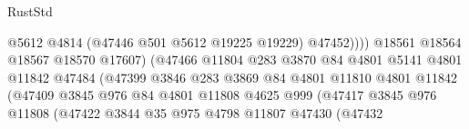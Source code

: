 \begin{lexlean}{RustStd}
\begin{coremodule}
                                                    @5612
                                                    @4814
                                                    (@47446 @501 @5612 @19225 @19229)
                                                    @47452))))
                                            @18561
                                            @18564
                                            @18567
                                            @18570
                                            @17607)
                                          (@47466
                                            @11804
                                            @283
                                            @3870
                                            @84
                                            @4801
                                            @5141
                                            @4801
                                            @11842
                                            @47484
                                            (@47399
                                              @3846
                                              @283
                                              @3869
                                              @84
                                              @4801
                                              @11810
                                              @4801
                                              @11842
                                              (@47409
                                                @3845
                                                @976
                                                @84
                                                @4801
                                                @11808
                                                @4625
                                                @999
                                                (@47417
                                                  @3845
                                                  @976
                                                  @11808
                                                  (@47422
                                                    @3844
                                                    @35
                                                    @975
                                                    @4798
                                                    @11807
                                                    @47430
                                                    (@47432

\end{coremodule}
\end{lexlean}
